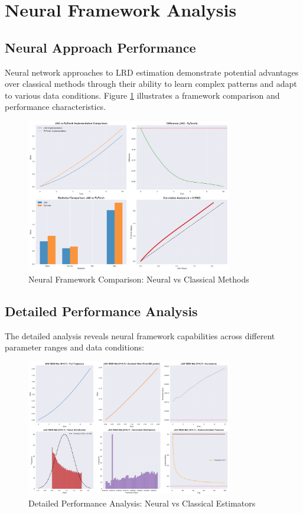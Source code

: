 \section{Neural Framework Analysis}

\subsection{Neural Approach Performance}

Neural network approaches to LRD estimation demonstrate potential advantages over classical methods through their ability to learn complex patterns and adapt to various data conditions. Figure \ref{fig:neural_framework} illustrates a framework comparison and performance characteristics.

\begin{figure}[h]
\centering
\includegraphics[width=0.8\textwidth]{neural_fsde_framework_comparison.png}
\caption{Neural Framework Comparison: Neural vs Classical Methods}
\label{fig:neural_framework}
\end{figure}

\subsection{Detailed Performance Analysis}

The detailed analysis reveals neural framework capabilities across different parameter ranges and data conditions:

\begin{figure}[h]
\centering
\includegraphics[width=0.8\textwidth]{neural_fsde_detailed_analysis.png}
\caption{Detailed Performance Analysis: Neural vs Classical Estimators}
\label{fig:detailed_analysis}
\end{figure}


